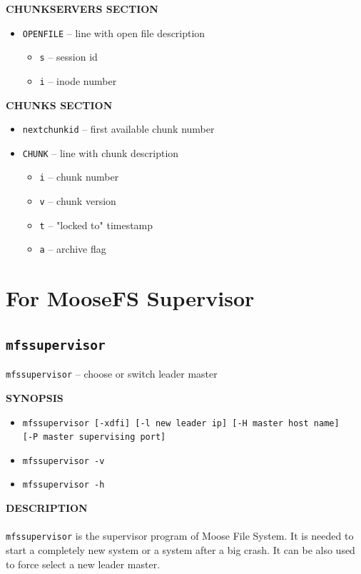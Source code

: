 \documentclass[a4paper,11pt,english]{report}
\def\code#1{\texttt{#1}}
\begin{document}
				\textbf{CHUNKSERVERS SECTION}
				\begin{itemize}
					\item \code{OPENFILE}  -- line with open file description
					\begin{itemize}
						\item \code{s}      -- session id
						\item \code{i}      -- inode number
					\end{itemize}
				\end{itemize}
				\bigskip
				
				\textbf{CHUNKS SECTION}
				\begin{itemize}
					\item \code{nextchunkid}         -- first available chunk number
					\item \code{CHUNK}     -- line with chunk description
					\begin{itemize}
						\item \code{i}      -- chunk number
						\item \code{v}      -- chunk version
						\item \code{t}      -- "locked to" timestamp
						\item \code{a}      -- archive flag
					\end{itemize}
				\end{itemize}
				
		\section{For MooseFS Supervisor}
			\subsection{\code{mfssupervisor}}
				\code{mfssupervisor} -- choose or switch leader master
				
				\bigskip
				\textbf{SYNOPSIS}
				\begin{itemize}
					\item \code{mfssupervisor [-xdfi] [-l new leader ip] [-H master host name]} \\ \code{[-P master supervising port]}
					\item \code{mfssupervisor -v}
					\item \code{mfssupervisor -h}
				\end{itemize}
				
				\bigskip
				\textbf{DESCRIPTION} \\\\
					\code{mfssupervisor} is the supervisor program of Moose  File  System.  It  is
					needed  to start a completely new system or a system after a big crash.
					It can be also used to force select a new leader master.
				
\end{document}
